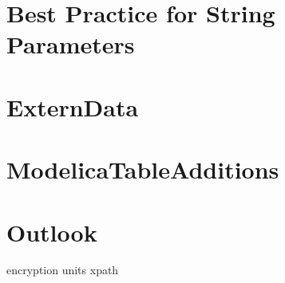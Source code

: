 \documentclass{modelica}
\begin{document}
\section{Best Practice for String Parameters}

\cite{modelisax2018hints}

\section{ExternData}

\section{ModelicaTableAdditions}

\section{Outlook}
encryption
units
xpath






\end{document}
